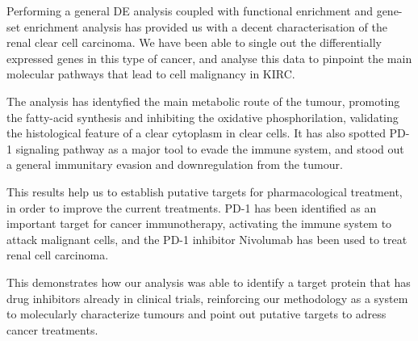 \documentclass[9pt,twocolumn,twoside]{gsajnl}
\begin{document}
Performing a general DE analysis coupled with functional enrichment and gene-set enrichment analysis has provided us with a decent characterisation of the renal clear cell carcinoma. We have been able to single out the differentially expressed genes in this type of cancer, and analyse this data to pinpoint the main molecular pathways that lead to cell malignancy in KIRC. 

The analysis has identyfied the main metabolic route of the tumour, promoting the fatty-acid synthesis and inhibiting the oxidative phosphorilation, validating the histological feature of a clear cytoplasm in clear cells. It has also spotted PD-1 signaling pathway as a major tool to evade the immune system, and
stood out a general immunitary evasion and downregulation from the tumour.

This results help us to establish putative targets for pharmacological treatment, in order to improve the current treatments. PD-1 has been identified as an important target for cancer immunotherapy, activating the immune system to attack malignant cells, and the PD-1 inhibitor Nivolumab \citep{nivolumab} has been used to treat renal cell carcinoma.


This demonstrates how our analysis was able to identify a target protein that has drug inhibitors already in clinical trials, reinforcing our  methodology as a system to molecularly characterize tumours and point out putative targets to adress cancer treatments.


\end{document}

